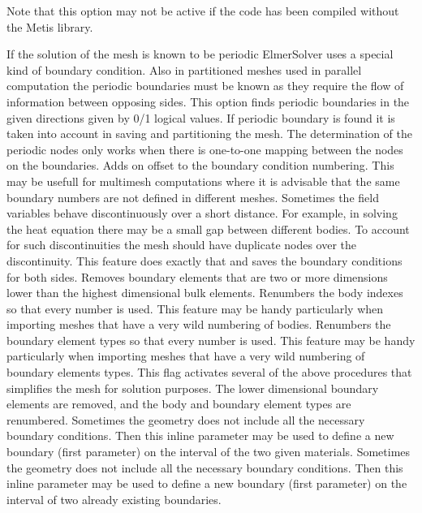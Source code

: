 Note that this option may not be active if the code has been compiled
without the Metis library.

If the solution of the mesh is known to be periodic ElmerSolver uses
a special kind of boundary condition. Also in partitioned meshes
used in parallel computation the periodic boundaries must be known
as they require the flow of information between opposing sides.
This option finds periodic boundaries in the given directions 
given by 0/1 logical values. If periodic boundary is found it is taken into
account in saving and partitioning the mesh.
The determination of the periodic nodes only works when there is one-to-one mapping
between the nodes on the boundaries. 
%
Adds on offset to the boundary condition numbering. This may be usefull for multimesh
computations where it is advisable that the same boundary numbers are not defined in 
different meshes. 
%
Sometimes the field variables behave discontinuously over a short distance.
For example, in solving the heat equation there may be a small gap between
different bodies. To account for such discontinuities the mesh should
have duplicate nodes over the discontinuity. This feature does exactly that
and saves the boundary conditions for both sides.
%
Removes boundary elements that are two or more dimensions lower than the 
highest dimensional bulk elements. 
%
Renumbers the body indexes so that every number is used. This feature may be handy 
particularly when importing meshes that have a very wild numbering of bodies.
%
Renumbers the boundary element types so that every number is used. This feature may be handy 
particularly when importing meshes that have a very wild numbering of boundary elements types.
%
This flag activates several of the above procedures that simplifies the mesh
for solution purposes. The lower dimensional boundary elements are removed, 
and the body and boundary element types are renumbered.
%
Sometimes the geometry does not include all the necessary boundary conditions. 
Then this inline parameter may be used to define a new boundary 
(first parameter) on the interval of the two given materials.
%
Sometimes the geometry does not include all the necessary boundary conditions. 
Then this inline parameter may be used to define a new boundary 
(first parameter) on the interval of two already existing boundaries.

